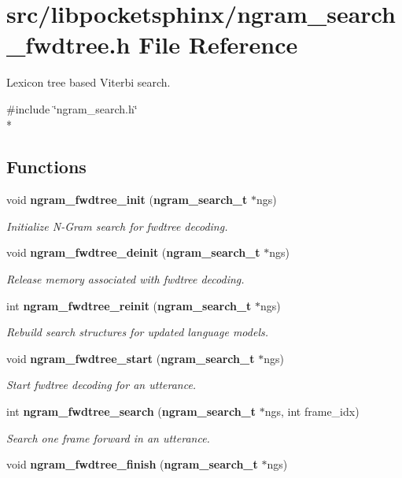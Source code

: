 \section{src/libpocketsphinx/ngram\-\_\-search\-\_\-fwdtree.h File Reference}
\label{ngram__search__fwdtree_8h}


Lexicon tree based Viterbi search.  


{\ttfamily \#include \char`\"{}ngram\-\_\-search.\-h\char`\"{}}\\*
\subsection*{Functions}
\begin{DoxyCompactItemize}
\item 
void {\bf ngram\-\_\-fwdtree\-\_\-init} ({\bf ngram\-\_\-search\-\_\-t} $\ast$ngs)\label{ngram__search__fwdtree_8h_a72c89a2a1f189495abee00e1853cddcc}

\begin{DoxyCompactList}\small\item\em Initialize N-\/\-Gram search for fwdtree decoding. \end{DoxyCompactList}\item 
void {\bf ngram\-\_\-fwdtree\-\_\-deinit} ({\bf ngram\-\_\-search\-\_\-t} $\ast$ngs)\label{ngram__search__fwdtree_8h_a0e0e0436b30e1074114e1d37991c5d6b}

\begin{DoxyCompactList}\small\item\em Release memory associated with fwdtree decoding. \end{DoxyCompactList}\item 
int {\bf ngram\-\_\-fwdtree\-\_\-reinit} ({\bf ngram\-\_\-search\-\_\-t} $\ast$ngs)\label{ngram__search__fwdtree_8h_aa53827b47025d4e7a63f3ddce763d84e}

\begin{DoxyCompactList}\small\item\em Rebuild search structures for updated language models. \end{DoxyCompactList}\item 
void {\bf ngram\-\_\-fwdtree\-\_\-start} ({\bf ngram\-\_\-search\-\_\-t} $\ast$ngs)\label{ngram__search__fwdtree_8h_af736200cd01a5d743dbab447ecc85d08}

\begin{DoxyCompactList}\small\item\em Start fwdtree decoding for an utterance. \end{DoxyCompactList}\item 
int {\bf ngram\-\_\-fwdtree\-\_\-search} ({\bf ngram\-\_\-search\-\_\-t} $\ast$ngs, int frame\-\_\-idx)
\begin{DoxyCompactList}\small\item\em Search one frame forward in an utterance. \end{DoxyCompactList}\item 
void {\bf ngram\-\_\-fwdtree\-\_\-finish} ({\bf ngram\-\_\-search\-\_\-t} $\ast$ngs)\label{ngram__search__fwdtree_8h_af32a83dbb9187542577a0c500b000840}


\end{DoxyCompactItemize}
